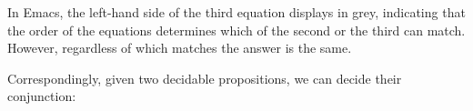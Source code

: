 \begin{fence}
\begin{code}%
\>[0]\AgdaSpace{}%
\AgdaSpace{}%
\<%
\\
%
\\[\AgdaEmptyExtraSkip]%
\>[0]\AgdaSpace{}%
\AgdaSymbol{:}\AgdaSpace{}%
\AgdaSpace{}%
\AgdaSpace{}%
\AgdaSpace{}%
\AgdaSpace{}%
\<%
\\
\>[0]%
\>[6]\AgdaSpace{}%
%
\>[14]\AgdaSymbol{=}\AgdaSpace{}%
\<%
\\
\>[0]\AgdaSpace{}%
\AgdaSpace{}%
\AgdaSymbol{\AgdaUnderscore{}}%
\>[14]\AgdaSymbol{=}\AgdaSpace{}%
\<%
\\
\>[0]\AgdaCatchallClause{\AgdaSymbol{\AgdaUnderscore{}}}%
\>[6]\AgdaSpace{}%
\AgdaSpace{}%
\AgdaSymbol{=}\AgdaSpace{}%
\<%
\end{code}
\end{fence}

In Emacs, the left-hand side of the third equation displays in grey,
indicating that the order of the equations determines which of the
second or the third can match. However, regardless of which matches the
answer is the same.

Correspondingly, given two decidable propositions, we can decide their
conjunction:

